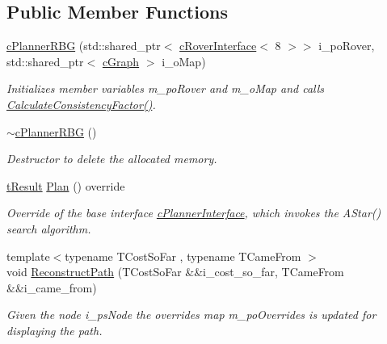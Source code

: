 \subsection*{Public Member Functions}
\begin{DoxyCompactItemize}
\item 
\mbox{\hyperlink{classplanner_1_1c_planner_r_b_g_a91296b98e64effc16f38e2430746d94d}{c\+Planner\+R\+BG}} (std\+::shared\+\_\+ptr$<$ \mbox{\hyperlink{classplanner_1_1c_rover_interface}{c\+Rover\+Interface}}$<$ 8 $>$$>$ i\+\_\+po\+Rover, std\+::shared\+\_\+ptr$<$ \mbox{\hyperlink{classplanner_1_1c_graph}{c\+Graph}} $>$ i\+\_\+o\+Map)
\begin{DoxyCompactList}\small\item\em Initializes member variables m\+\_\+po\+Rover and m\+\_\+o\+Map and calls \mbox{\hyperlink{classplanner_1_1c_planner_a2e5a745f83f903662eff914d8beddb5e}{Calculate\+Consistency\+Factor()}}. \end{DoxyCompactList}\item 
\mbox{\label{classplanner_1_1c_planner_r_b_g_ad582fdf21ae0d86a23e9c25546b66f0e}} 
\mbox{\hyperlink{classplanner_1_1c_planner_r_b_g_ad582fdf21ae0d86a23e9c25546b66f0e}{$\sim$c\+Planner\+R\+BG}} ()
\begin{DoxyCompactList}\small\item\em Destructor to delete the allocated memory. \end{DoxyCompactList}\item 
\mbox{\hyperlink{structt_result}{t\+Result}} \mbox{\hyperlink{classplanner_1_1c_planner_r_b_g_a0bbd752702da582a47dbd153c0065eb5}{Plan}} () override
\begin{DoxyCompactList}\small\item\em Override of the base interface \mbox{\hyperlink{classplanner_1_1c_planner_interface}{c\+Planner\+Interface}}, which invokes the A\+Star() search algorithm. \end{DoxyCompactList}\item 
{\footnotesize template$<$typename T\+Cost\+So\+Far , typename T\+Came\+From $>$ }\\void \mbox{\hyperlink{classplanner_1_1c_planner_r_b_g_a1af74d398b286f1e05e6ade495efbbd0}{Reconstruct\+Path}} (T\+Cost\+So\+Far \&\&i\+\_\+cost\+\_\+so\+\_\+far, T\+Came\+From \&\&i\+\_\+came\+\_\+from)
\begin{DoxyCompactList}\small\item\em Given the node i\+\_\+ps\+Node the overrides map m\+\_\+po\+Overrides is updated for displaying the path. \end{DoxyCompactList}\item 
$$
\end{DoxyCompactItemize}
